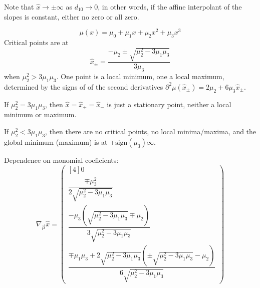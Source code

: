 Note that $\hat{x} \to \pm \infty$ as $d_{10} \to 0$,
in other words,
if the affine interpolant of the slopes is constant,
either no zero or all zero.


\begin{equation}
\mu(x) = \mu_0 + \mu_1 x + \mu_2 x^2 + \mu_3 x^3
\end{equation}
Critical points are at
\begin{equation}
\hat{x}_{\pm} = \frac{-\mu_2 \pm \sqrt{ \mu_2^{2} - 3 \mu_1 \mu_3 }}{3 \mu_3}
\end{equation}
when $\mu_2^{2} > 3 \mu_1 \mu_3$.
One point is a local minimum, one a local maximum, 
determined by the signs of of the second derivatives
$\partial^2\mu(\hat{x}_{\pm}) = 2 \mu_2 + 6 \mu_3 \hat{x}_{\pm}$.

If $\mu_2^{2} = 3 \mu_1 \mu_3$, 
then $\hat{x} = \hat{x}_{+} = \hat{x}_{-}$ is just a stationary
point, neither a local minimum or maximum.

If $\mu_2^{2} < 3 \mu_1 \mu_3$, then there are no critical points,
no local minima/maxima, and the global minimum (maximum) is at
$\mp\text{sign}(\mu_3)\infty$.

Dependence on monomial coeficients:
\begin{equation}
\nabla_{\vec{\mu}} \hat{x} =
\begin{pmatrix}[4]
0 
\\
\dfrac{
\mp \mu_3^{2}
}{
2 \sqrt{\mu_2^{2} -3 \mu_1 \mu_3}
}
\\
\dfrac{
-\mu_3 \left(\sqrt{\mu_2^{2} -3 \mu_1 \mu_3} \mp \mu_2\right)
}{
3 \sqrt{\mu_2^{2} -3 \mu_1 \mu_3}
}
\\
\dfrac{
\mp \mu_1 \mu_3
+ 2 \sqrt{\mu_2^{2} - 3 \mu_1 \mu_3}
\left(\pm \sqrt{\mu_2^{2} - 3 \mu_1 \mu_3}  - \mu_2 \right)
}{
6 \sqrt{\mu_2^{2} -3 \mu_1 \mu_3}
}
\end{pmatrix}
\end{equation}

